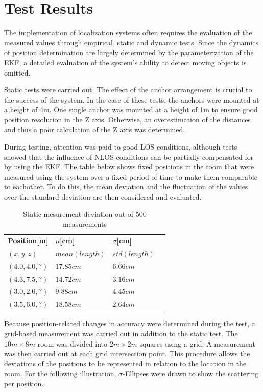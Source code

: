 \documentclass[10pt,a4paper,twocolumn]{article}
\begin{document}
\section{Test Results}\label{section:tests}
The implementation of localization systems often requires the evaluation of the measured values through empirical,
static and dynamic tests.
Since the dynamics of position determination are largely determined by the parameterization of the \ac{EKF},
a detailed evaluation of the system's ability to detect moving objects is omitted.

Static tests were carried out.
The effect of the anchor arrangement is crucial to the success of the system.
In the case of these tests, the anchors were mounted at a height of 4m.
One single anchor was mounted at a height of 1m to ensure good position resolution in the Z axis.
Otherwise, an overestimation of the distances and thus a poor calculation of the Z axis was determined.

During testing, attention was paid to good \ac{LOS} conditions,
although tests showed that the influence of \ac{NLOS} conditions can be partially compensated for by using the \ac{EKF}.
The table below shows fixed positions in the room that were measured using the system
over a fixed period of time to make them comparable to eachother.
To do this, the mean deviation and the fluctuation of the values over the standard deviation are then considered and evaluated.

\begin{table}[H]
  \centering
  \begin{tabular}{l l l c}
    \toprule
    \textbf{Position[m]} & \textbf{$\mu$[cm]} & \textbf{$\sigma$[cm]}\\
    $(x,y,z)$ & $mean(length)$ & $std(length)$\\
    \midrule
    $(4.0,4.0,?)$ & $17.85cm$ & $6.66cm$\\
    $(4.3,7.5,?)$ & $14.72cm$ & $3.16cm$\\
    $(3.0,2.0,?)$ & $9.88cm$ & $4.45cm$\\
    $(3.5,6.0,?)$ & $18.58cm$ & $2.64cm$\\
    \bottomrule
  \end{tabular}
  \caption{Static mesurement deviation out of 500 measurements}
\end{table}

Because position-related changes in accuracy were determined during the test,
a grid-based measurement was carried out in addition to the static test.
The $10m\times8m$ room was divided into $2m\times2m$ squares using a grid.
A measurement was then carried out at each grid intersection point.
This procedure allows the deviations of the positions to be represented in relation to the location in the room.
For the following illustration, $\sigma$-Ellipses were drawn to show the scattering per position.
\end{document}
